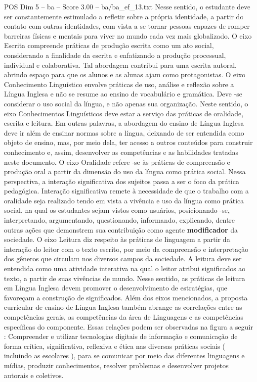 \begin{textsample}{POS Dim 5 – ba – Score 3.00 – ba/ba\_ef\_13.txt}
Nesse sentido, o estudante deve ser constantemente estimulado a refletir sobre a própria identidade, a partir do contato com outras identidades, com vista a se tornar pessoas capazes de romper barreiras físicas e mentais para viver no mundo cada vez mais globalizado.
O eixo Escrita compreende práticas de produção escrita como um ato social, considerando a finalidade da escrita e enfatizando a produção processual, individual e colaborativa.
Tal abordagem contribui para uma escrita autoral, abrindo espaço para que os alunos e as alunas ajam como protagonistas.
O eixo Conhecimento Linguístico envolve práticas de uso, análise e reflexão sobre a Língua Inglesa e não se resume ao ensino de vocabulário e gramática.
Deve -se considerar o uso social da língua, e não apenas sua organização.
Neste sentido, o eixo Conhecimentos Linguísticos deve estar a serviço das práticas de oralidade, escrita e leitura.
Em outras palavras, a abordagem do ensino de Língua Inglesa deve ir além de ensinar normas sobre a língua, deixando de ser entendida como objeto de ensino, mas, por meio dela, ter acesso a outros conteúdos para construir conhecimento e, assim, desenvolver as competências e as habilidades tratadas neste documento.
O eixo Oralidade refere -se às práticas de compreensão e produção oral a partir da dimensão do uso da língua como prática social.
Nessa perspectiva, a interação significativa dos sujeitos passa a ser o foco da prática pedagógica.
Interação significativa remete à necessidade de que o trabalho com a oralidade seja realizado tendo em vista a vivência e uso da língua como prática social, na qual os estudantes sejam vistos como usuários, posicionando -se, interpretando, argumentando, questionando, informando, explicando, dentre outras ações que demonstrem sua contribuição como agente \textbf{modificador} da sociedade.
O eixo Leitura diz respeito às práticas de linguagem a partir da interação do leitor com o texto escrito, por meio da compreensão e interpretação dos gêneros que circulam nos diversos campos da sociedade.
A leitura deve ser entendida como uma atividade interativa na qual o leitor atribui significados ao texto, a partir de suas vivências de mundo.
Nesse sentido, as práticas de leitura em Língua Inglesa devem promover o desenvolvimento de estratégias, que favoreçam a construção de significados.
Além dos eixos mencionados, a proposta curricular de ensino de Língua Inglesa também abrange as correlações entre as competências gerais, as competências da área de Linguagens e as competências específicas do componente.
Essas relações podem ser observadas na figura a seguir : Compreender e utilizar tecnologias digitais de informação e comunicação de forma crítica, significativa, reflexiva e ética nas diversas práticas sociais ( incluindo as escolares ), para se comunicar por meio das diferentes linguagens e mídias, produzir conhecimentos, resolver problemas e desenvolver projetos autorais e coletivos.

\end{textsample}
